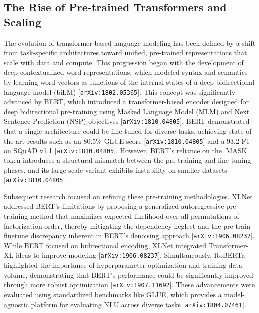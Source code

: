 \documentclass[11pt]{article}
\begin{document}
\subsection{The Rise of Pre-trained Transformers and Scaling}

The evolution of transformer-based language modeling has been defined by a shift from task-specific architectures toward unified, pre-trained representations that scale with data and compute. This progression began with the development of deep contextualized word representations, which modeled syntax and semantics by learning word vectors as functions of the internal states of a deep bidirectional language model (biLM) [\texttt{arXiv:1802.05365}]. This concept was significantly advanced by BERT, which introduced a transformer-based encoder designed for deep bidirectional pre-training using Masked Language Model (MLM) and Next Sentence Prediction (NSP) objectives [\texttt{arXiv:1810.04805}]. BERT demonstrated that a single architecture could be fine-tuned for diverse tasks, achieving state-of-the-art results such as an 80.5\% GLUE score [\texttt{arXiv:1810.04805}] and a 93.2 F1 on SQuAD v1.1 [\texttt{arXiv:1810.04805}]. However, BERT's reliance on the [MASK] token introduces a structural mismatch between the pre-training and fine-tuning phases, and its large-scale variant exhibits instability on smaller datasets [\texttt{arXiv:1810.04805}].

Subsequent research focused on refining these pre-training methodologies. XLNet addressed BERT's limitations by proposing a generalized autoregressive pre-training method that maximizes expected likelihood over all permutations of factorization order, thereby mitigating the dependency neglect and the pre-train-finetune discrepancy inherent in BERT's denoising approach [\texttt{arXiv:1906.08237}]. While BERT focused on bidirectional encoding, XLNet integrated Transformer-XL ideas to improve modeling [\texttt{arXiv:1906.08237}]. Simultaneously, RoBERTa highlighted the importance of hyperparameter optimization and training data volume, demonstrating that BERT's performance could be significantly improved through more robust optimization [\texttt{arXiv:1907.11692}]. These advancements were evaluated using standardized benchmarks like GLUE, which provides a model-agnostic platform for evaluating NLU across diverse tasks [\texttt{arXiv:1804.07461}].
\end{document}
